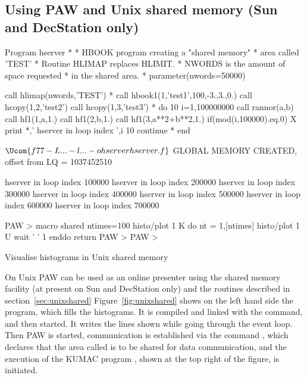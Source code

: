 \newpage

\subsection{Using PAW and Unix shared memory (Sun and DecStation only)}
\label{sec:unixpresenter}
 
\begin{XMP}
      Program hserver
*
*     HBOOK program creating a "shared memory" 
*     area called 'TEST'
*     Routine HLIMAP replaces HLIMIT.
*     NWORDS is the amount of space requested 
*     in the shared area.
*
      parameter(nwords=50000)

      call hlimap(nwords,'TEST')
*
      call hbook1(1,'test1',100,-3.,3.,0.)
      call hcopy(1,2,'test2')
      call hcopy(1,3,'test3')
*
      do 10 i=1,100000000
         call rannor(a,b)
         call hf1(1,a,1.)
         call hf1(2,b,1.)
         call hf1(3,a**2+b**2,1.)
         if(mod(i,100000).eq.0)
     X   print *,' hserver in loop index ',i
  10  continue
*
      end

$ \Ucom{f77 -L... -l... -ohserver hserver.f}

$ 
GLOBAL MEMORY CREATED, 
        offset from LQ =  1037452510

 hserver in loop index   100000
 hserver in loop index   200000
 hserver in loop index   300000
 hserver in loop index   400000
 hserver in loop index   500000
 hserver in loop index   600000
 hserver in loop index   700000
 
\end{XMP}
\begin{XMP}
    PAW > 
        macro shared ntimes=100
        histo/plot 1 K
        do nt = 1,[ntimes]
           histo/plot 1 U
           wait ' ' 1
        enddo
        return
    PAW > 
    PAW > 
\end{XMP}
\begin{Fighere}
\caption{Visualise histograms in Unix shared memory}
\label{fig:unixshared}
\end{Fighere}
\NODOC{\end{minipage}}
 
On Unix PAW can be used as an online presenter
using the shared memory facility 
(at present on Sun and DecStation only)
and the routines described in section~\ref{sec:unixshared}
%
Figure~\ref{fig:unixshared} shows on the left hand side
the program, which fills the histograms.
It is compiled and linked with the  command,
and then started. 
It writes the lines shown while going through the event loop.
Then PAW is started, communication is established via the command
, which declares that the area called 
is to be shared for data communication, and the execution
of the KUMAC program ,
shown at the top right of the figure, is initiated.

